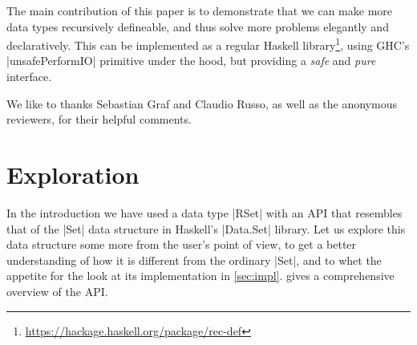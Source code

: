 \documentclass[manuscript,review,screen,acmsmall]{acmart}
\begin{document}
\medskip\noindent

The main contribution of this paper is to demonstrate that we can make more data types recursively defineable, and thus solve more problems elegantly and declaratively.
This can be implemented as a regular Haskell library\footnote{\url{https://hackage.haskell.org/package/rec-def}}, using GHC's |unsafePerformIO| primitive under the hood, but providing a \emph{safe} and \emph{pure} interface.

\iffalse
The main contributions of this paper are:

\begin{itemize}
\item We demonstrate that by making more data types recursively definable, more problems can be solved elegantly and declaratively. They are \emph{safe}, \emph{pure} and are a natural fit for a language like Haskell.

\item We show how to implement this as a regular library, using GHC's |unsafePerformIO| primitive under the hood.\footnote{The library can be found as \texttt{rec-def} on Hackage; an anonymized copy is included in this submission.}

\item We discuss the difficulties of answering the question whether a language extension like this can still be considered \emph{pure}, contributing questions rather than conclusive answers.

\end{itemize}
\fi

\begin{acks}
We like to thanks Sebastian Graf and Claudio Russo, as well as the anonymous reviewers, for their helpful comments.
\end{acks}

\section{Exploration}\label{sec:exploration}

In the introduction we have used a data type |RSet| with an API that resembles that of the |Set| data structure in Haskell's |Data.Set| library. Let us explore this data structure some more from the user's point of view, to get a better understanding of how it is different from the ordinary |Set|, and to whet the appetite for the look at its implementation in \cref{sec:impl}.
 gives a comprehensive overview of the API.
\end{document}

